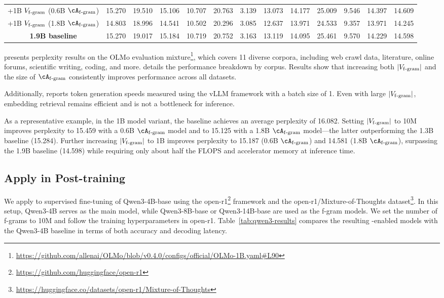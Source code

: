 \begin{table}[htbp]
{\begin{tabular}{c|ccccccccccc|c}
  +1B $V_{\mathrm{f\text{-}gram}}$ (0.6B $\Afgram$) & 15.270 &  19.510 & 15.106 & 10.707 & 20.763 &  3.139 & 13.073  & 14.177  &  25.009 & 9.546   & 14.397  & 14.609 \\
  +1B $V_{\mathrm{f\text{-}gram}}$ (1.8B $\Afgram$) & 14.803&  18.996 & 14.541 & 10.502 & 20.296 &  3.085 & 12.637  & 13.971  &  24.533 & 9.357   & 13.971  & 14.245 \\
  \midrule
  \textbf{1.9B baseline} & 15.270 &  19.017 & 15.184 & 10.719 & 20.752 &  3.163 & 13.119  & 14.095  &  25.461 & 9.570   & 14.229  & 14.598 \\
\bottomrule
\end{tabular}
}
\end{table}

 presents perplexity results on the OLMo evaluation mixture\footnote{\url{https://github.com/allenai/OLMo/blob/v0.4.0/configs/official/OLMo-1B.yaml\#L90}}, which covers 11 diverse corpora, including web crawl data, literature, online forums, scientific writing, coding, and more.  details the performance breakdown by corpus. Results show that increasing both $|V_{\mathrm{f\text{-}gram}}|$ and the size of $\Afgram$ consistently improves performance across all datasets.

Additionally,  reports token generation speeds measured using the vLLM framework \citep{kwon2023efficient} with a batch size of 1. Even with large $|V_{\mathrm{f\text{-}gram}}|$, embedding retrieval remains efficient and is not a bottleneck for inference.

As a representative example, in the 1B model variant, the baseline achieves an average perplexity of 16.082. Setting $|V_{\mathrm{f\text{-}gram}}|$ to 10M improves perplexity to 15.459 with a 0.6B $\Afgram$ model and to 15.125 with a 1.8B $\Afgram$ model—the latter outperforming the 1.3B baseline (15.284). Further increasing $|V_{\mathrm{f\text{-}gram}}|$ to 1B improves perplexity to 15.187 (0.6B $\Afgram$) and 14.581 (1.8B $\Afgram$), surpassing the 1.9B baseline (14.598) while requiring only about half the FLOPS and accelerator memory at inference time.

\subsection{Apply \SCONE in Post-training}
\label{subsec:sft_qwen3}

We apply \SCONE to supervised fine-tuning of Qwen3-4B-base using the open-r1\footnote{\url{https://github.com/huggingface/open-r1}} framework and the open-r1/Mixture-of-Thoughts dataset\footnote{\url{https://huggingface.co/datasets/open-r1/Mixture-of-Thoughts}}. In this setup, Qwen3-4B serves as the main model, while Qwen3-8B-base or Qwen3-14B-base are used as the f-gram models. We set the number of f-grams to 10M and follow the training hyperparameters in open-r1. Table~\ref{tab:qwen3-results} compares the resulting \SCONE-enabled models with the Qwen3-4B baseline in terms of both accuracy and decoding latency.

